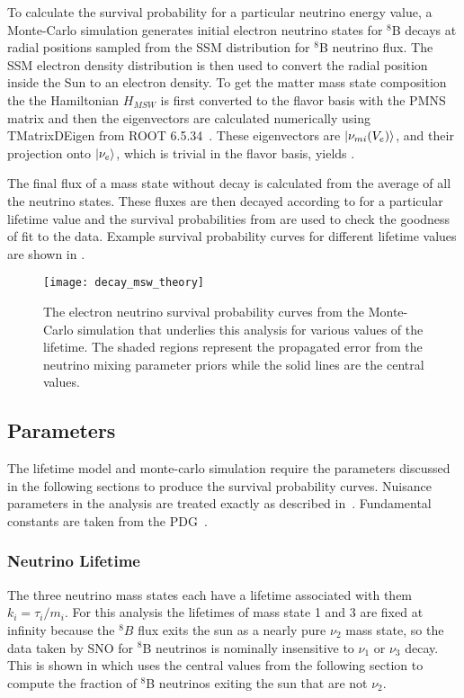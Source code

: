To calculate the survival probability for a particular neutrino energy value, a Monte-Carlo simulation generates initial electron neutrino states for $^8$B decays at radial positions sampled from the SSM distribution for $^8$B neutrino flux.
The SSM electron density distribution is then used to convert the radial position inside the Sun to an electron density.
To get the matter mass state composition the the Hamiltonian $H_{MSW}$ is first converted to the flavor basis with the PMNS matrix and then the eigenvectors are calculated numerically using TMatrixDEigen from ROOT 6.5.34~\cite{root}.
These eigenvectors are $\ket{\nu_{mi}(V_e)}$, and their projection onto $\ket{\nu_e}$, which is trivial in the flavor basis, yields .

The final flux of a mass state without decay is calculated from the average of all the neutrino states.
These fluxes are then decayed according to  for a particular lifetime value and the survival probabilities from  are used to check the goodness of fit to the data.
Example survival probability curves for different lifetime values are shown in .

\begin{figure}
\centering
\texttt{[image: decay\_msw\_theory]}
\caption{
The electron neutrino survival probability curves from the Monte-Carlo simulation that underlies this analysis for various values of the lifetime. The shaded regions represent the propagated error from the neutrino mixing parameter priors while the solid lines are the central values.
}
\label{fig:model}
\end{figure}

\subsection{Parameters}
\label{parameters}

The lifetime model and monte-carlo simulation require the parameters discussed in the following sections to produce the survival probability curves.
Nuisance parameters in the analysis are treated exactly as described in~\cite{plthesis}.
Fundamental constants are taken from the PDG~\cite{pdg}.

\subsubsection{Neutrino Lifetime}
The three neutrino mass states each have a lifetime associated with them $k_i = \tau_i / m_i$. 
For this analysis the lifetimes of mass state 1 and 3 are fixed at infinity because the $^8B$ flux exits the sun as a nearly pure $\nu_2$ mass state, so the data taken by SNO for $^8$B neutrinos is nominally insensitive to $\nu_1$ or $\nu_3$ decay.
This is shown in  which uses the central values from the following section to compute the fraction of $^8$B neutrinos exiting the sun that are not $\nu_2$.

